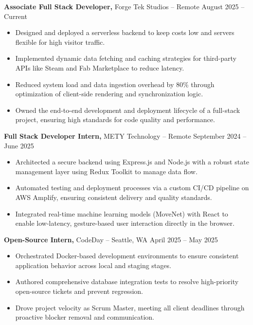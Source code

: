\documentclass[11pt]{article}       %
\begin{document}
\textbf{Associate Full Stack Developer,} {Forge Tek Studios} -- Remote \hfill August 2025 -- Current 
\vspace{-9pt}
\begin{itemize}
  \item Designed and deployed a serverless backend to keep costs low and servers flexible for high visitor traffic.
  \item Implemented dynamic data fetching and caching strategies for third-party APIs like Steam and Fab Marketplace to reduce latency.
  \item Reduced system load and data ingestion overhead by 80\% through optimization of client-side rendering and synchronization logic.
  \item Owned the end-to-end development and deployment lifecycle of a full-stack project, ensuring high standards for code quality and performance.
\end{itemize}

\textbf{Full Stack Developer Intern,} {METY Technology} -- Remote \hfill September 2024 -- June 2025 
\vspace{-9pt}
\begin{itemize}
  \item Architected a secure backend using Express.js and Node.js with a robust state management layer using Redux Toolkit to manage data flow.
  \item Automated testing and deployment processes via a custom CI/CD pipeline on AWS Amplify, ensuring consistent delivery and quality standards.
  \item Integrated real-time machine learning models (MoveNet) with React to enable low-latency, gesture-based user interaction directly in the browser.
\end{itemize}

\textbf{Open-Source Intern,} {CodeDay} -- Seattle, WA \hfill April 2025 -- May 2025 \\
\vspace{-9pt}
\begin{itemize}
  \item Orchestrated Docker-based development environments to ensure consistent application behavior across local and staging stages.
  \item Authored comprehensive database integration tests to resolve high-priority open-source tickets and prevent regression.
  \item Drove project velocity as Scrum Master, meeting all client deadlines through proactive blocker removal and communication.
\end{itemize}
\end{document}
